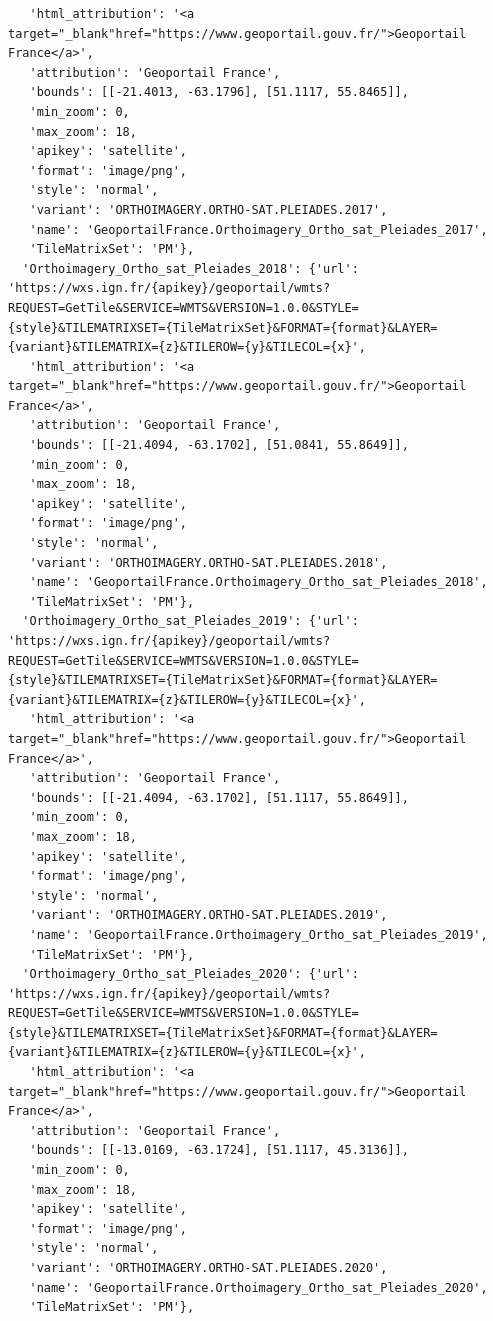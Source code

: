 \documentclass[
  letterpaper,
  DIV=11,
  numbers=noendperiod]{scrreprt}
\begin{document}
\begin{verbatim}
   'html_attribution': '<a target="_blank"href="https://www.geoportail.gouv.fr/">Geoportail France</a>',
   'attribution': 'Geoportail France',
   'bounds': [[-21.4013, -63.1796], [51.1117, 55.8465]],
   'min_zoom': 0,
   'max_zoom': 18,
   'apikey': 'satellite',
   'format': 'image/png',
   'style': 'normal',
   'variant': 'ORTHOIMAGERY.ORTHO-SAT.PLEIADES.2017',
   'name': 'GeoportailFrance.Orthoimagery_Ortho_sat_Pleiades_2017',
   'TileMatrixSet': 'PM'},
  'Orthoimagery_Ortho_sat_Pleiades_2018': {'url': 'https://wxs.ign.fr/{apikey}/geoportail/wmts?REQUEST=GetTile&SERVICE=WMTS&VERSION=1.0.0&STYLE={style}&TILEMATRIXSET={TileMatrixSet}&FORMAT={format}&LAYER={variant}&TILEMATRIX={z}&TILEROW={y}&TILECOL={x}',
   'html_attribution': '<a target="_blank"href="https://www.geoportail.gouv.fr/">Geoportail France</a>',
   'attribution': 'Geoportail France',
   'bounds': [[-21.4094, -63.1702], [51.0841, 55.8649]],
   'min_zoom': 0,
   'max_zoom': 18,
   'apikey': 'satellite',
   'format': 'image/png',
   'style': 'normal',
   'variant': 'ORTHOIMAGERY.ORTHO-SAT.PLEIADES.2018',
   'name': 'GeoportailFrance.Orthoimagery_Ortho_sat_Pleiades_2018',
   'TileMatrixSet': 'PM'},
  'Orthoimagery_Ortho_sat_Pleiades_2019': {'url': 'https://wxs.ign.fr/{apikey}/geoportail/wmts?REQUEST=GetTile&SERVICE=WMTS&VERSION=1.0.0&STYLE={style}&TILEMATRIXSET={TileMatrixSet}&FORMAT={format}&LAYER={variant}&TILEMATRIX={z}&TILEROW={y}&TILECOL={x}',
   'html_attribution': '<a target="_blank"href="https://www.geoportail.gouv.fr/">Geoportail France</a>',
   'attribution': 'Geoportail France',
   'bounds': [[-21.4094, -63.1702], [51.1117, 55.8649]],
   'min_zoom': 0,
   'max_zoom': 18,
   'apikey': 'satellite',
   'format': 'image/png',
   'style': 'normal',
   'variant': 'ORTHOIMAGERY.ORTHO-SAT.PLEIADES.2019',
   'name': 'GeoportailFrance.Orthoimagery_Ortho_sat_Pleiades_2019',
   'TileMatrixSet': 'PM'},
  'Orthoimagery_Ortho_sat_Pleiades_2020': {'url': 'https://wxs.ign.fr/{apikey}/geoportail/wmts?REQUEST=GetTile&SERVICE=WMTS&VERSION=1.0.0&STYLE={style}&TILEMATRIXSET={TileMatrixSet}&FORMAT={format}&LAYER={variant}&TILEMATRIX={z}&TILEROW={y}&TILECOL={x}',
   'html_attribution': '<a target="_blank"href="https://www.geoportail.gouv.fr/">Geoportail France</a>',
   'attribution': 'Geoportail France',
   'bounds': [[-13.0169, -63.1724], [51.1117, 45.3136]],
   'min_zoom': 0,
   'max_zoom': 18,
   'apikey': 'satellite',
   'format': 'image/png',
   'style': 'normal',
   'variant': 'ORTHOIMAGERY.ORTHO-SAT.PLEIADES.2020',
   'name': 'GeoportailFrance.Orthoimagery_Ortho_sat_Pleiades_2020',
   'TileMatrixSet': 'PM'},

\end{verbatim}
\end{document}
